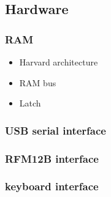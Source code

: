 \subsection{Hardware}
\subsubsection{RAM}
\begin{itemize}
\item Harvard architecture
\item RAM bus
\item Latch
\end{itemize}

\subsubsection{USB serial interface}

\subsubsection{RFM12B interface}

\subsubsection{keyboard interface}

